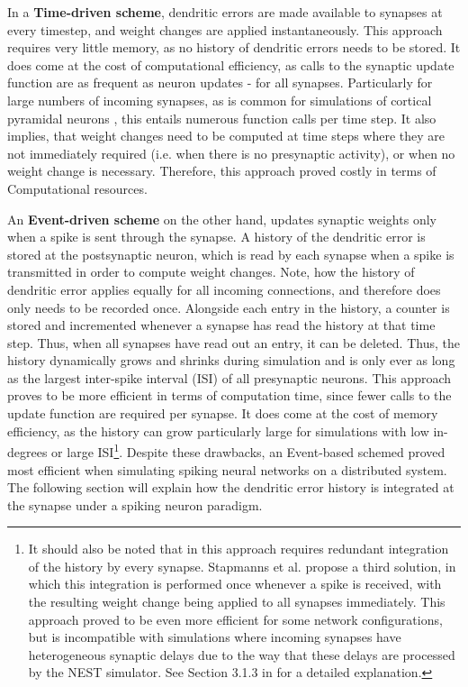 In a \textbf{Time-driven scheme}, dendritic errors are made available to synapses at every timestep, and weight changes
are applied instantaneously. This approach requires very little memory, as no history of dendritic errors needs to be
stored. It does come at the cost of computational efficiency, as calls to the synaptic update function are as frequent
as neuron updates - for all synapses. Particularly for large numbers of incoming synapses, as is common for simulations
of cortical pyramidal neurons \citep{potjans2014cell}, this entails numerous function calls per time step. It also
implies, that weight changes need to be computed at time steps where they are not immediately required (i.e. when there
is no presynaptic activity), or when no weight change is necessary. Therefore, this approach proved costly in terms of
Computational resources.

An \textbf{Event-driven scheme} on the other hand, updates synaptic weights only when a spike is sent through the
synapse. A history of the dendritic error \intro is stored at the postsynaptic neuron, which is read by each synapse
when a spike is transmitted in order to compute weight changes. Note, how the history of dendritic error applies equally
for all incoming connections, and therefore does only needs to be recorded once. Alongside each entry in the history, a
counter is stored and incremented whenever a synapse has read the history at that time step. Thus, when all synapses
have read out an entry, it can be deleted. Thus, the history dynamically grows and shrinks during simulation and is only
ever as long as the largest inter-spike interval (ISI) of all presynaptic neurons. This approach proves to be more
efficient in terms of computation time, since fewer calls to the update function are required per synapse. It does come
at the cost of memory efficiency, as the history can grow particularly large for simulations with low in-degrees or
large ISI\footnote{It should also be noted that in this approach requires redundant integration of the history by every
  synapse. Stapmanns et al. propose a third solution, in which this integration is performed once whenever a spike is
  received, with the resulting weight change being applied to all synapses immediately. This approach proved to be even
  more efficient for some network configurations, but is incompatible with simulations where incoming synapses have
  heterogeneous synaptic delays due to the way that these delays are processed by the NEST simulator. See Section 3.1.3 in
  \cite{Stapmanns2021} for a detailed explanation.}. Despite these drawbacks, an Event-based schemed proved most efficient
when simulating spiking neural networks on a distributed system. The following section will explain how the dendritic
error history is integrated at the synapse under a spiking neuron paradigm. \newline


